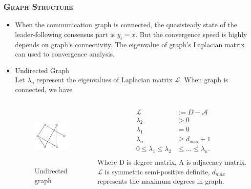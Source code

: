 \begin{frame}
    \frametitle{\normalsize\textsc{Graph Structure}}\transwipe
    
    \begin{itemize}
      \item When the communication graph is connected, the quasisteady state of the leader-following consensus part is $y_i = x$. But the \textcolor[rgb]{0.00,0.00,1.00}{convergence speed} is highly depends on graph's connectivity. The eigenvalue of graph's Laplacian matrix can used to convergence analysis.
      \item \textcolor[rgb]{1.00,0.00,0.00}{ Undirected Graph}\\
       Let $\lambda_{n}$ represent the eigenvalues of Laplacian matrix $\mathcal{L}$. When graph is connected, we have \\
      \begin{columns}[c]
        \column{6cm}
          \begin{figure}
              \includegraphics[height=1.2in]{figure/game/2-undirecti.png}
              \vspace{-6pt}
              \caption{ Undirected graph}
          \end{figure}
          \column{6cm}
          \begin{equation}
            \begin{aligned}
              \mathcal{L} &:=D-\mathcal{A} \\ 
              \lambda_{2} & > 0 \\
              \lambda_{1} & = 0 \\
              \lambda_{n} & \geq d_{\max }+1 \\ 
              0 \leq \lambda_{1} \leq \lambda_{2} &\leq \ldots \leq \lambda_{n}.\\ 
            \end{aligned}
            \end{equation}
         Where D is degree matrix, A is adjacency matrix. $\mathcal{L}$ is symmetric semi-positive definite, $d_{max}$ represents the maximum degrees in graph. 
        \end{columns}

    \end{itemize}
  
\end{frame}

